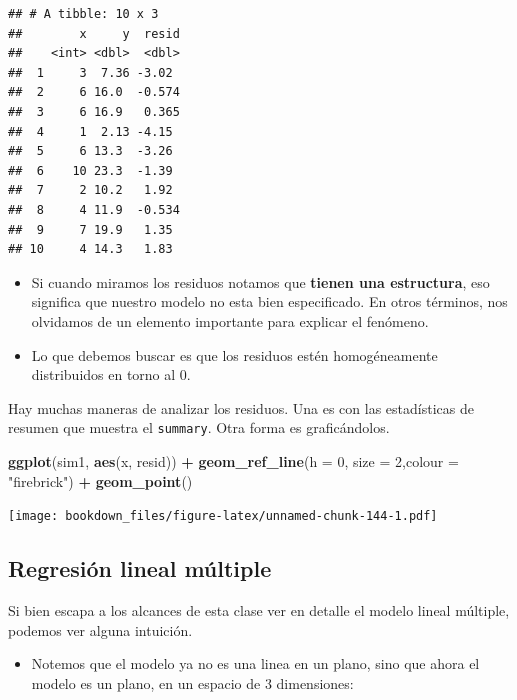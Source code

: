 \documentclass[]{book}
\newenvironment{Shaded}{\begin{snugshade}}{\end{snugshade}}
\newcommand{\DataTypeTok}[1]{\textcolor[rgb]{0.13,0.29,0.53}{#1}}
\newcommand{\DecValTok}[1]{\textcolor[rgb]{0.00,0.00,0.81}{#1}}
\newcommand{\KeywordTok}[1]{\textcolor[rgb]{0.13,0.29,0.53}{\textbf{#1}}}
\newcommand{\NormalTok}[1]{#1}
\newcommand{\OperatorTok}[1]{\textcolor[rgb]{0.81,0.36,0.00}{\textbf{#1}}}
\newcommand{\StringTok}[1]{\textcolor[rgb]{0.31,0.60,0.02}{#1}}
\providecommand{\tightlist}{%
  \setlength{\itemsep}{0pt}\setlength{\parskip}{0pt}}
\begin{document}
\begin{verbatim}
## # A tibble: 10 x 3
##        x     y  resid
##    <int> <dbl>  <dbl>
##  1     3  7.36 -3.02 
##  2     6 16.0  -0.574
##  3     6 16.9   0.365
##  4     1  2.13 -4.15 
##  5     6 13.3  -3.26 
##  6    10 23.3  -1.39 
##  7     2 10.2   1.92 
##  8     4 11.9  -0.534
##  9     7 19.9   1.35 
## 10     4 14.3   1.83
\end{verbatim}

\begin{itemize}
\tightlist
\item
  Si cuando miramos los residuos notamos que \textbf{tienen una estructura}, eso significa que nuestro modelo no esta bien especificado. En otros términos, nos olvidamos de un elemento importante para explicar el fenómeno.
\item
  Lo que debemos buscar es que los residuos estén homogéneamente distribuidos en torno al 0.
\end{itemize}

Hay muchas maneras de analizar los residuos. Una es con las estadísticas de resumen que muestra el \texttt{summary}. Otra forma es graficándolos.

\begin{Shaded}
\begin{Highlighting}[]
\KeywordTok{ggplot}\NormalTok{(sim1, }\KeywordTok{aes}\NormalTok{(x, resid)) }\OperatorTok{+}\StringTok{ }
\StringTok{  }\KeywordTok{geom_ref_line}\NormalTok{(}\DataTypeTok{h =} \DecValTok{0}\NormalTok{, }\DataTypeTok{size =} \DecValTok{2}\NormalTok{,}\DataTypeTok{colour =} \StringTok{"firebrick"}\NormalTok{) }\OperatorTok{+}
\StringTok{  }\KeywordTok{geom_point}\NormalTok{() }
\end{Highlighting}
\end{Shaded}

\texttt{[image: bookdown\_files/figure-latex/unnamed-chunk-144-1.pdf]}

\hypertarget{regresion-lineal-multiple}{%
\subsection{Regresión lineal múltiple}\label{regresion-lineal-multiple}}

Si bien escapa a los alcances de esta clase ver en detalle el modelo lineal múltiple, podemos ver alguna intuición.

\begin{itemize}
\tightlist
\item
  Notemos que el modelo ya no es una linea en un plano, sino que ahora el modelo es un plano, en un espacio de 3 dimensiones:
\end{itemize}
\end{document}
